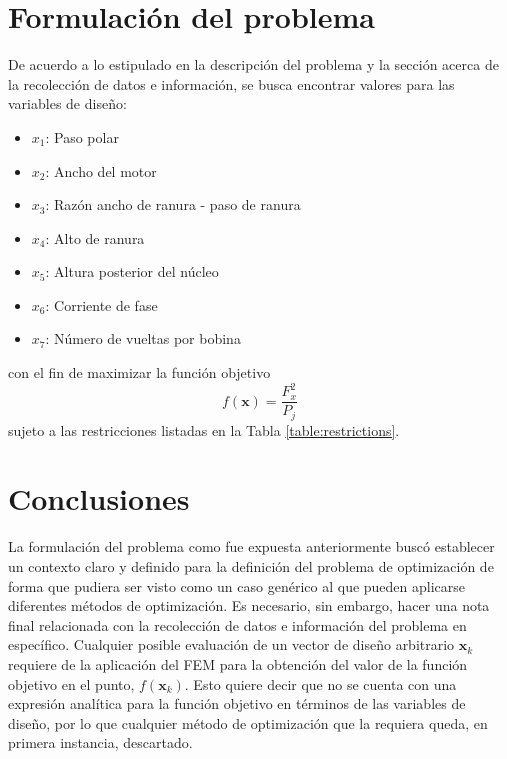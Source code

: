 \section{Formulación del problema}
De acuerdo a lo estipulado en la descripción del problema y la sección acerca de la recolección de datos e información, se busca encontrar valores para las variables de diseño:
\begin{itemize}
\item $x_1$: Paso polar
\item $x_2$: Ancho del motor
\item $x_3$: Razón ancho de ranura - paso de ranura
\item $x_4$: Alto de ranura
\item $x_5$: Altura posterior del núcleo
\item $x_6$: Corriente de fase
\item $x_7$: Número de vueltas por bobina
\end{itemize}
con el fin de maximizar la función objetivo
\begin{equation*}
f(\mathbf{x}) = \frac{F_x^2}{P_j}
\end{equation*}
sujeto a las restricciones listadas en la Tabla \ref{table:restrictions}.

\section{Conclusiones}
La formulación del problema como fue expuesta anteriormente buscó establecer un contexto claro y definido para la definición del problema de optimización de forma que pudiera ser visto como un caso genérico al que pueden aplicarse diferentes métodos de optimización. Es necesario, sin embargo, hacer una nota final relacionada con la recolección de datos e información del problema en específico.
Cualquier posible evaluación de un vector de diseño arbitrario $\mathbf{x}_k$ requiere de la aplicación del FEM para la obtención del valor de la función objetivo en el punto, $f(\mathbf{x}_k)$. Esto quiere decir que no se cuenta con una expresión analítica para la función objetivo en términos de las variables de diseño, por lo que cualquier método de optimización que la requiera queda, en primera instancia, descartado.

